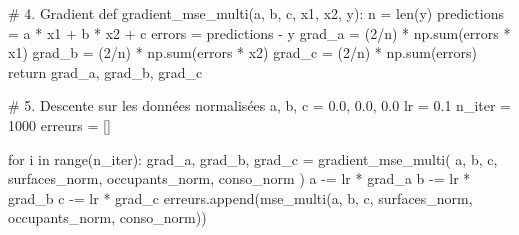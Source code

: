\documentclass[
  french,
  11pt,
  a4paper,
]{scrbook}
\newenvironment{Shaded}{}{}
\newcommand{\BuiltInTok}[1]{\textcolor[rgb]{0.84,0.23,0.29}{#1}}
\newcommand{\CommentTok}[1]{\textcolor[rgb]{0.42,0.45,0.49}{#1}}
\newcommand{\ControlFlowTok}[1]{\textcolor[rgb]{0.84,0.23,0.29}{#1}}
\newcommand{\DecValTok}[1]{\textcolor[rgb]{0.00,0.36,0.77}{#1}}
\newcommand{\FloatTok}[1]{\textcolor[rgb]{0.00,0.36,0.77}{#1}}
\newcommand{\KeywordTok}[1]{\textcolor[rgb]{0.84,0.23,0.29}{#1}}
\newcommand{\NormalTok}[1]{\textcolor[rgb]{0.14,0.16,0.18}{#1}}
\newcommand{\OperatorTok}[1]{\textcolor[rgb]{0.14,0.16,0.18}{#1}}
\begin{document}
\begin{tcolorbox}
\begin{Shaded}
\begin{Highlighting}[]
\CommentTok{\# 4. Gradient}
\KeywordTok{def}\NormalTok{ gradient\_mse\_multi(a, b, c, x1, x2, y):}
\NormalTok{    n }\OperatorTok{=} \BuiltInTok{len}\NormalTok{(y)}
\NormalTok{    predictions }\OperatorTok{=}\NormalTok{ a }\OperatorTok{*}\NormalTok{ x1 }\OperatorTok{+}\NormalTok{ b }\OperatorTok{*}\NormalTok{ x2 }\OperatorTok{+}\NormalTok{ c}
\NormalTok{    errors }\OperatorTok{=}\NormalTok{ predictions }\OperatorTok{{-}}\NormalTok{ y}
\NormalTok{    grad\_a }\OperatorTok{=}\NormalTok{ (}\DecValTok{2}\OperatorTok{/}\NormalTok{n) }\OperatorTok{*}\NormalTok{ np.}\BuiltInTok{sum}\NormalTok{(errors }\OperatorTok{*}\NormalTok{ x1)}
\NormalTok{    grad\_b }\OperatorTok{=}\NormalTok{ (}\DecValTok{2}\OperatorTok{/}\NormalTok{n) }\OperatorTok{*}\NormalTok{ np.}\BuiltInTok{sum}\NormalTok{(errors }\OperatorTok{*}\NormalTok{ x2)}
\NormalTok{    grad\_c }\OperatorTok{=}\NormalTok{ (}\DecValTok{2}\OperatorTok{/}\NormalTok{n) }\OperatorTok{*}\NormalTok{ np.}\BuiltInTok{sum}\NormalTok{(errors)}
    \ControlFlowTok{return}\NormalTok{ grad\_a, grad\_b, grad\_c}

\CommentTok{\# 5. Descente sur les données normalisées}
\NormalTok{a, b, c }\OperatorTok{=} \FloatTok{0.0}\NormalTok{, }\FloatTok{0.0}\NormalTok{, }\FloatTok{0.0}
\NormalTok{lr }\OperatorTok{=} \FloatTok{0.1}
\NormalTok{n\_iter }\OperatorTok{=} \DecValTok{1000}
\NormalTok{erreurs }\OperatorTok{=}\NormalTok{ []}

\ControlFlowTok{for}\NormalTok{ i }\KeywordTok{in} \BuiltInTok{range}\NormalTok{(n\_iter):}
\NormalTok{    grad\_a, grad\_b, grad\_c }\OperatorTok{=}\NormalTok{ gradient\_mse\_multi(}
\NormalTok{        a, b, c, surfaces\_norm, occupants\_norm, conso\_norm}
\NormalTok{    )}
\NormalTok{    a }\OperatorTok{{-}=}\NormalTok{ lr }\OperatorTok{*}\NormalTok{ grad\_a}
\NormalTok{    b }\OperatorTok{{-}=}\NormalTok{ lr }\OperatorTok{*}\NormalTok{ grad\_b}
\NormalTok{    c }\OperatorTok{{-}=}\NormalTok{ lr }\OperatorTok{*}\NormalTok{ grad\_c}
\NormalTok{    erreurs.append(mse\_multi(a, b, c, surfaces\_norm, occupants\_norm, conso\_norm))}


\end{Highlighting}
\end{Shaded}
\end{tcolorbox}
\end{document}
